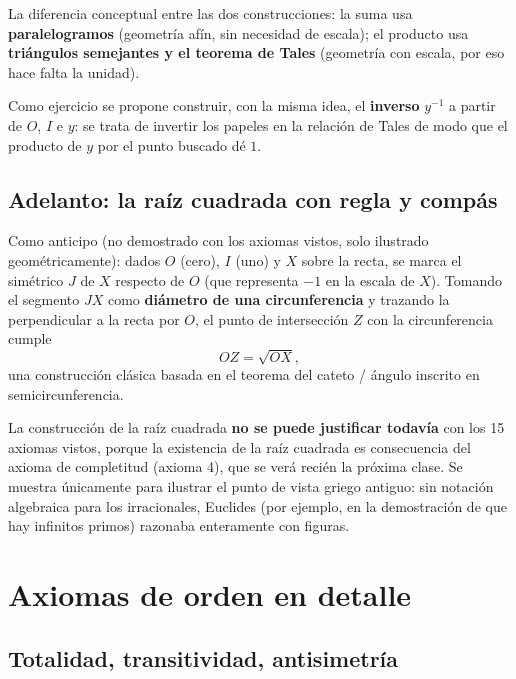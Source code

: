 \documentclass[12pt,a4paper]{article}
\begin{document}
\begin{notebox}
La diferencia conceptual entre las dos construcciones: la suma usa
\textbf{paralelogramos} (geometría afín, sin necesidad de escala); el
producto usa \textbf{triángulos semejantes y el teorema de Tales}
(geometría con escala, por eso hace falta la unidad).
\end{notebox}

Como ejercicio se propone construir, con la misma idea, el \textbf{inverso}
$y^{-1}$ a partir de $O$, $I$ e $y$: se trata de invertir los papeles en la
relación de Tales de modo que el producto de $y$ por el punto buscado dé
$1$.

\subsection{Adelanto: la raíz cuadrada con regla y compás}

Como anticipo (no demostrado con los axiomas vistos, solo ilustrado
geométricamente): dados $O$ (cero), $I$ (uno) y $X$ sobre la recta, se marca
el simétrico $J$ de $X$ respecto de $O$ (que representa $-1$ en la escala de
$X$). Tomando el segmento $JX$ como \textbf{diámetro de una circunferencia}
y trazando la perpendicular a la recta por $O$, el punto de intersección
$Z$ con la circunferencia cumple
\[
OZ = \sqrt{OX},
\]
una construcción clásica basada en el teorema del cateto / ángulo inscrito
en semicircunferencia.

\begin{warnbox}
La construcción de la raíz cuadrada \textbf{no se puede justificar todavía}
con los 15 axiomas vistos, porque la existencia de la raíz cuadrada es
consecuencia del axioma de completitud (axioma 4), que se verá recién la
próxima clase. Se muestra únicamente para ilustrar el punto de vista griego
antiguo: sin notación algebraica para los irracionales, Euclides (por
ejemplo, en la demostración de que hay infinitos primos) razonaba
enteramente con figuras.
\end{warnbox}

\section{Axiomas de orden en detalle}

\subsection{Totalidad, transitividad, antisimetría}
\end{document}
